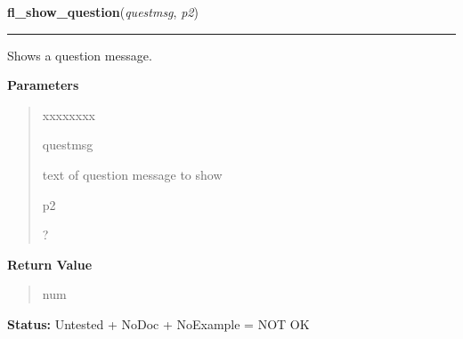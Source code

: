     \label{xformslib:library:fl_show_question}

    \vspace{0.5ex}

\hspace{.8\funcindent}\begin{boxedminipage}{\funcwidth}

    \raggedright \textbf{fl\_show\_question}(\textit{questmsg}, \textit{p2})

    \vspace{-1.5ex}

    \rule{\textwidth}{0.5\fboxrule}
\setlength{\parskip}{2ex}
    Shows a question message.

\setlength{\parskip}{1ex}
      \textbf{Parameters}
      \vspace{-1ex}

      \begin{quote}
        \begin{Ventry}{xxxxxxxx}

          \item[questmsg]

          text of question message to show

          \item[p2]

          ?

        \end{Ventry}

      \end{quote}

      \textbf{Return Value}
    \vspace{-1ex}

      \begin{quote}
      num

      \end{quote}

\textbf{Status:} Untested + NoDoc + NoExample = NOT OK



    \end{boxedminipage}

    \label{xformslib:library:fl_hide_question}

    \vspace{0.5ex}

